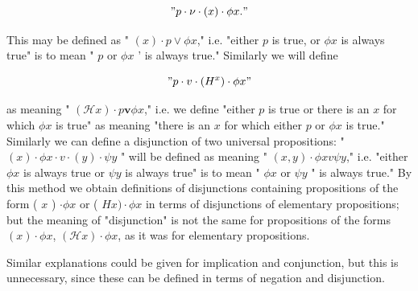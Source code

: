 \documentclass[10pt]{article}
\begin{document}
$$
" p \cdot \nu \cdot(x) \cdot \phi x . "
$$

This may be defined as " $(x) \cdot p \vee \phi x$," i.e. "either $p$ is true, or $\phi x$ is always true" is to mean " $p$ or $\phi x$ ' is always true." Similarly we will define

$$
" p \cdot v \cdot\left(H^{x}\right) \cdot \phi x "
$$

as meaning " $(\mathcal{H} x) \cdot p \mathbf{v} \phi x$," i.e. we define "either $p$ is true or there is an $x$ for which $\phi x$ is true" as meaning "there is an $x$ for which either $p$ or $\phi x$ is true." Similarly we can define a disjunction of two universal propositions: " $(x) \cdot \phi x \cdot v \cdot(y) \cdot \psi y$ " will be defined as meaning " $(x, y) \cdot \phi x v \psi y$," i.e. "either $\phi x$ is always true or $\psi y$ is always true" is to mean " $\phi x$ or $\psi y$ " is always true." By this method we obtain definitions of disjunctions containing propositions of the form ( $x$ ) $\cdot \phi x$ or ( $H x) \cdot \phi x$ in terms of disjunctions of elementary propositions; but the meaning of "disjunction" is not the same for propositions of the forms $(x) \cdot \phi x$, $(\mathcal{H} x) \cdot \phi x$, as it was for elementary propositions.

Similar explanations could be given for implication and conjunction, but this is unnecessary, since these can be defined in terms of negation and disjunction.
\end{document}
